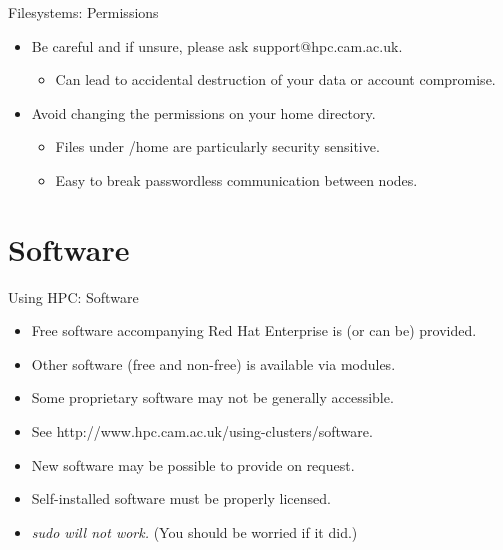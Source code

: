 \begin{frame}{Filesystems: Permissions}
\begin{itemize}
\item{\color{red}Be careful and if unsure, please ask support@hpc.cam.ac.uk.}
\begin{itemize}
\item{Can lead to \alert{accidental destruction} of your data or \alert{account compromise}.}
\end{itemize}
\item{Avoid changing the permissions on your home directory.}
\begin{itemize}
\item{Files under /home are particularly security sensitive.}
\item{Easy to break passwordless communication between nodes.}
\end{itemize}
\end{itemize}
\end{frame}

\section{Software}
\begin{frame}{Using HPC: Software}
\begin{itemize}
\item{Free software accompanying \alert{Red Hat Enterprise} is (or can be) provided.}
\item{Other software (free and non-free) is available via \alert{modules}.}
\item{Some proprietary software may not be generally accessible.}
\item{See \alert{http://www.hpc.cam.ac.uk/using-clusters/software}.}
\item{New software may be possible to provide on request.}
\item{\alert{Self-installed software must be properly licensed.}}
  \pause
\item{\color{red}\emph{sudo will not work.}\/ (You should be worried if it did.)}
\end{itemize}
\end{frame}

